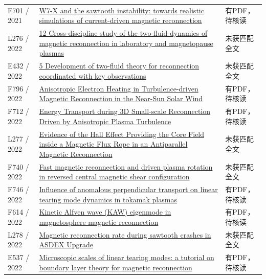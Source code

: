 \begin{longtable}{P{24mm}P{97mm}P{27mm}}
F701 / 2021 & \href{https://doi.org/10.1088/1741-4326/ac077d}{W7-X and the sawtooth instability: towards realistic simulations of current-driven magnetic reconnection} & 有PDF，待核读\\

L276 / 2022 & \href{https://doi.org/10.2307/j.ctv1w7v22j.15}{12 Cross-discipline study of the two-fluid dynamics of magnetic reconnection in laboratory and magnetopause plasmas} & 未获匹配全文\\

E432 / 2022 & \href{https://doi.org/10.2307/j.ctv1w7v22j.8}{5 Development of two-fluid theory for reconnection coordinated with key observations} & 未获匹配全文\\

F796 / 2022 & \href{https://doi.org/10.3847/1538-4357/ac7da6}{Anisotropic Electron Heating in Turbulence-driven Magnetic Reconnection in the Near-Sun Solar Wind} & 有PDF，待核读\\

F712 / 2022 & \href{https://doi.org/10.3847/1538-4357/ac8667}{Energy Transport during 3D Small-scale Reconnection Driven by Anisotropic Plasma Turbulence} & 有PDF，待核读\\

L277 / 2022 & \href{https://doi.org/10.3847/1538-4357/aca27f}{Evidence of the Hall Effect Providing the Core Field inside a Magnetic Flux Rope in an Antiparallel Magnetic Reconnection} & 未获匹配全文\\

F740 / 2022 & \href{https://doi.org/10.1088/1741-4326/ac984f}{Fast magnetic reconnection and driven plasma rotation in reversed central magnetic shear configuration} & 未获匹配全文\\

F746 / 2022 & \href{https://doi.org/10.1063/5.0082331}{Influence of anomalous perpendicular transport on linear tearing mode dynamics in tokamak plasmas} & 有PDF，待核读\\

F614 / 2022 & \href{https://doi.org/10.1007/s41614-022-00107-y}{Kinetic Alfven wave (KAW) eigenmode in magnetosphere magnetic reconnection} & 有PDF，待核读\\

L278 / 2022 & \href{https://doi.org/10.1088/1741-4326/ac6617}{Magnetic reconnection rate during sawtooth crashes in ASDEX Upgrade} & 未获匹配全文\\

E537 / 2022 & \href{https://doi.org/10.1017/s0022377822001088}{Microscopic scales of linear tearing modes: a tutorial on boundary layer theory for magnetic reconnection} & 有PDF，待核读\\


\end{longtable}
